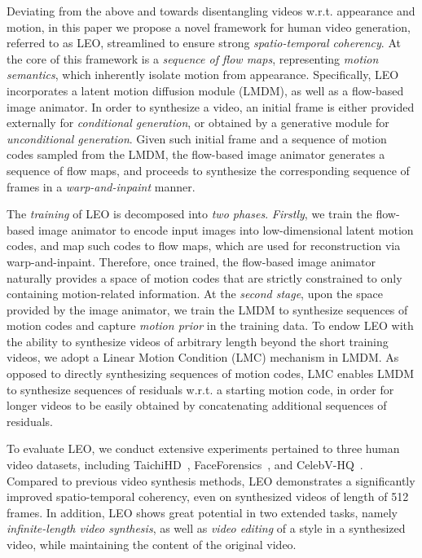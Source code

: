 Deviating from the above and towards disentangling videos w.r.t. appearance and motion,
in this paper we propose a novel framework for human video generation, referred to as LEO, streamlined to ensure strong \textit{spatio-temporal coherency}.
At the core of this framework is a \textit{sequence of flow maps}, representing \textit{motion semantics},
which inherently isolate motion from appearance.
Specifically, LEO incorporates a latent motion diffusion module (LMDM), as well as a flow-based image animator.
In order to synthesize a video, an initial frame is either provided externally for \textit{conditional generation},
or obtained by a generative module for \textit{unconditional generation}.
Given such initial frame and a sequence of motion codes sampled from the LMDM, the flow-based image animator generates a sequence of flow maps, and proceeds to synthesize the corresponding sequence of frames in a \textit{warp-and-inpaint} manner.

The \textit{training} of LEO is decomposed into \textit{two phases}. \textit{Firstly}, we train the flow-based image animator to encode input images into low-dimensional latent motion codes,
and map such codes to flow maps, which are used for reconstruction via warp-and-inpaint.
Therefore, once trained, 
the flow-based image animator naturally provides a space of motion codes that are strictly constrained to only containing motion-related information.
At the \textit{second stage},
upon the space provided by the image animator,
we train the LMDM to synthesize sequences of motion codes and capture \textit{motion prior} in the training data.
To endow LEO with the ability to synthesize videos of arbitrary length beyond the short training videos,
we adopt a Linear Motion Condition (LMC) mechanism
in LMDM. As opposed to directly synthesizing sequences of motion codes,
LMC enables LMDM to synthesize sequences of residuals w.r.t. a starting motion code,
in order for longer videos to be easily obtained by concatenating additional sequences of residuals.

To evaluate LEO,
we conduct extensive experiments pertained to three human video datasets,
including TaichiHD~\cite{fomm}, FaceForensics~\cite{rossler2018faceforensics}, and CelebV-HQ~\cite{zhu2022celebvhq}. 
Compared to previous video synthesis methods,
LEO demonstrates a significantly improved spatio-temporal coherency,
even on synthesized videos of length of 512 frames.
In addition,
LEO shows great potential in two extended tasks,
namely \textit{infinite-length video synthesis},
as well as \textit{video editing} of a style in a synthesized video, while maintaining the content of the original video.

